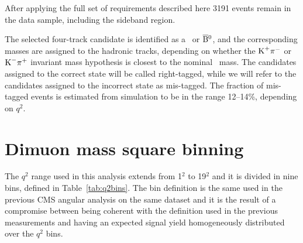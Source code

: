After applying the full set of requirements described here 3191 events remain in the data sample, including the sideband region.

The selected four-track candidate is identified as a \PBz\ or $\overline{\textrm{B}}{}^{0}$, and the corresponding masses are assigned to the hadronic tracks, depending on whether the $\textrm{K}^{+}\pi^{-}$ or $\textrm{K}^{-}\pi^{+}$ invariant mass hypothesis is closest to the nominal \cPKstz\ mass.
The candidates assigned to the correct state will be called right-tagged, while we will refer to the candidates assigned to the incorrect state as mis-tagged.
The fraction of mis-tagged events is estimated from simulation to be in the range 12--14\%, depending on $q^2$.

\section{Dimuon mass square binning}


The $q^2$ range used in this analysis extends from 1\GeV$^2$ to 19\GeV$^2$ and it is divided in nine bins, defined in Table~\ref{tab:q2bins}.
The bin definition is the same used in the previous CMS angular analysis on the same dataset and it is the result of a compromise between being coherent with the definition used in the previous measurements and having an expected signal yield homogeneously distributed over the $q^2$ bins.

